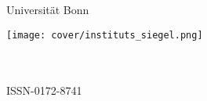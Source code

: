 %
%
%
{\thispagestyle{empty}
  \addtolength{\oddsidemargin}{1.0cm}\addtolength{\topmargin}{1.0cm}
  \rmfamily\setlength{\parindent}{0pt}
  \begin{center}
    {\fontsize{44}{50}\selectfont
      Universität Bonn}

    \vspace*{20pt}

    \begin{singlespace}
      \fontsize{30}{40}\selectfont
      \InstituteName
    \end{singlespace}

    \vspace*{40pt}

    \begin{onehalfspace}
      \bfseries\huge
      \thesistitle
    \end{onehalfspace}

    \vspace*{20pt}

    {\LARGE
      \thesisauthor
    }
  \end{center}

  \vspace*{\fill}

  \thesisabstract

  \vspace*{\fill}

  {\normalfont\normalsize
    \parbox{0.3\textwidth}{\InstituteAddress}
    \parbox{0.4\textwidth}{%
      \centering
      \texttt{[image: cover/instituts\_siegel.png]}
    }
    \parbox{0.3\textwidth}{%
      \thesisnumber\\
      \thesismonth{} \thesisyear\\
      ISSN-0172-8741
    }
  }
}
